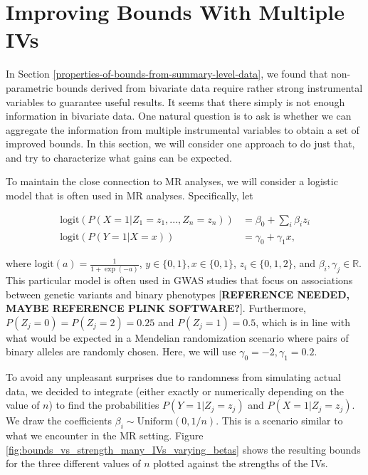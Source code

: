 \documentclass[
]{article}
\theoremstyle{plain}
\begin{document}
\hypertarget{improving-bounds-with-multiple-ivs}{%
\section{Improving Bounds With Multiple IVs}\label{improving-bounds-with-multiple-ivs}}

In Section \ref{properties-of-bounds-from-summary-level-data}, we found that non-parametric bounds derived from bivariate data require rather strong instrumental variables to guarantee useful results. It seems that there simply is not enough information in bivariate data. One natural question is to ask is whether we can aggregate the information from multiple instrumental variables to obtain a set of improved bounds. In this section, we will consider one approach to do just that, and try to characterize what gains can be expected.

To maintain the close connection to MR analyses, we will consider a logistic model that is often used in MR analyses. Specifically, let

\[\begin{aligned}
\text{logit}(P(X = 1 | Z_1 = z_1, ..., Z_n = z_n)) &= \beta_0 + \sum_i \beta_i z_i \\
\text{logit}(P(Y = 1 | X = x)) &= \gamma_0 + \gamma_1 x,
\end{aligned}\]

where \(\text{logit}(a) = \frac{1}{1 + \exp(-a)}\), \(y \in \{0,1\}, x \in \{0,1\}\), \(z_i \in \{0, 1, 2\}\), and \(\beta_i, \gamma_j \in \mathbb{R}\). This particular model is often used in GWAS studies that focus on associations between genetic variants and binary phenotypes {[}\textbf{REFERENCE NEEDED, MAYBE REFERENCE PLINK SOFTWARE?}{]}. Furthermore, \(P(Z_j = 0) = P(Z_j = 2) = 0.25\) and \(P(Z_j = 1) = 0.5\), which is in line with what would be expected in a Mendelian randomization scenario where pairs of binary alleles are randomly chosen. Here, we will use \(\gamma_0 = -2, \gamma_1 = 0.2\).

To avoid any unpleasant surprises due to randomness from simulating actual data, we decided to integrate (either exactly or numerically depending on the value of \(n\)) to find the probabilities \(P(Y = 1 | Z_j = z_j)\) and \(P(X = 1 | Z_j = z_j)\). We draw the coefficients \(\beta_i \sim \text{Uniform}(0, 1/n)\). This is a scenario similar to what we encounter in the MR setting. Figure \ref{fig:bounds_vs_strength_many_IVs_varying_betas} shows the resulting bounds for the three different values of \(n\) plotted against the strengths of the IVs.
\end{document}

